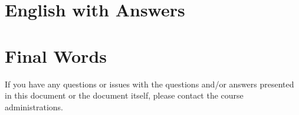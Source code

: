 \documentclass[a4paper,11pt,oneside]{article}
\begin{document}
\begin{sloppypar}
\section{English with Answers}
\label{englishWithAnswers}










\section{Final Words}
\label{finalWords}
If you have any questions or issues with the questions and/or answers presented in this document or the document itself, please contact the course administrations.

\pagebreak



\end{sloppypar}
\end{document}
